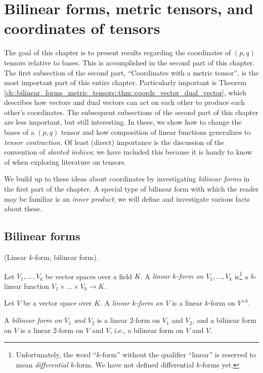 \chapter{Bilinear forms, metric tensors, and coordinates of tensors}

\label{ch::bilinear_forms_metric_tensors}

The goal of this chapter is to present results regarding the coordinates of $(p, q)$ tensors relative to bases. This is accomplished in the second part of this chapter. The first subsection of the second part, ``Coordinates with a metric tensor'', is the most important part of this entire chapter. Particularly important is Theorem \ref{ch::bilinear_forms_metric_tensors::thm::coords_vector_dual_vector},
which describes how vectors and dual vectors can act on each other to produce each other's coordinates. The subsequent subsections of the second part of this chapter are less important, but still interesting. In these, we show how to change the bases of a $(p, q)$ tensor and how composition of linear functions generalizes to \textit{tensor contraction}. Of least (direct) importance is the discussion of the convention of \textit{slanted indices}; we have included this because it is handy to know of when exploring literature on tensors.

We build up to these ideas about coordinates by investigating \textit{bilinear forms} in the first part of the chapter. A special type of bilinear form with which the reader may be familiar is an \textit{inner product}; we will define and investigate various facts about these.

\section{Bilinear forms}

\begin{defn}
    (Linear $k$-form, bilinear form).
    
    Let $V_1, ..., V_k$ be vector spaces over a field $K$. A \textit{linear $k$-form on $V_1, ..., V_k$} is\footnote{Unfortunately, the word ``$k$-form'' without the qualifier ``linear'' is reserved to mean \textit{differential} $k$-form. We have not defined differential $k$-forms yet.} a $k$-linear function ${V_1 \times ... \times V_k \rightarrow K}$.
    
    Let $V$ be a vector space over $K$. A \textit{linear $k$-form on $V$} is a linear $k$-form on $V^{\times k}$.
    
    A \textit{bilinear form on $V_1$ and $V_2$} is a linear $2$-form on $V_1$ and $V_2$, and a bilinear form on $V$ is a linear $2$-form on $V$ and $V$, i.e., a bilinear form on $V$ and $V$.
\end{defn}

